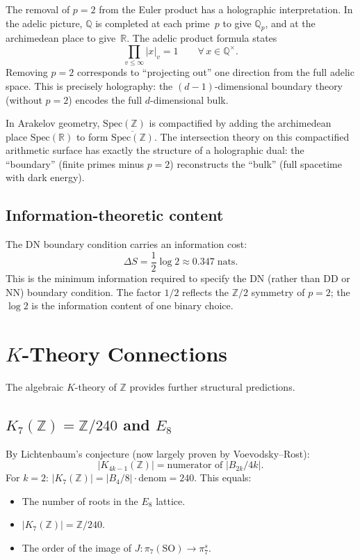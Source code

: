 \documentclass[12pt,a4paper]{article}
\theoremstyle{definition}
\newcommand{\Spec}{\mathrm{Spec}}
\newcommand{\Z}{\mathbb{Z}}
\newcommand{\Q}{\mathbb{Q}}
\newcommand{\R}{\mathbb{R}}
\begin{document}
The removal of $p=2$ from the Euler product has a holographic interpretation.
In the adelic picture, $\Q$ is completed at each prime~$p$ to give $\Q_p$,
and at the archimedean place to give~$\R$.  The adelic product formula states
\[
  \prod_{v\le\infty}|x|_v=1\qquad\forall\,x\in\Q^\times.
\]
Removing $p=2$ corresponds to ``projecting out'' one direction from the
full adelic space.  This is precisely holography: the $(d-1)$-dimensional
boundary theory (without $p=2$) encodes the full $d$-dimensional bulk.

In Arakelov geometry, $\Spec(\Z)$ is compactified by adding the archimedean
place $\Spec(\R)$ to form $\overline{\Spec(\Z)}$.  The intersection theory
on this compactified arithmetic surface has exactly the structure of a
holographic dual: the ``boundary'' (finite primes minus $p=2$) reconstructs
the ``bulk'' (full spacetime with dark energy).

\subsection{Information-theoretic content}

The DN boundary condition carries an information cost:
\[
  \Delta S = \frac{1}{2}\log 2 \approx 0.347\;\text{nats}.
\]
This is the minimum information required to specify the DN (rather than DD or NN)
boundary condition.  The factor $1/2$ reflects the $\Z/2$ symmetry of $p=2$;
the $\log 2$ is the information content of one binary choice.

\section{$K$-Theory Connections}\label{sec:Ktheory}

The algebraic $K$-theory of $\Z$ provides further structural predictions.

\subsection{$K_7(\Z)=\Z/240$ and $E_8$}

By Lichtenbaum's conjecture (now largely proven by Voevodsky--Rost):
\[
  |K_{4k-1}(\Z)|=\text{numerator of }|B_{2k}/4k|.
\]
For $k=2$: $|K_7(\Z)|=|B_4/8|\cdot\text{denom}=240$.  This equals:
\begin{itemize}
\item The number of roots in the $E_8$ lattice.
\item $|K_7(\Z)|=\Z/240$.
\item The order of the image of $J:\pi_7(\mathrm{SO})\to\pi_7^s$.
\end{itemize}
\end{document}

